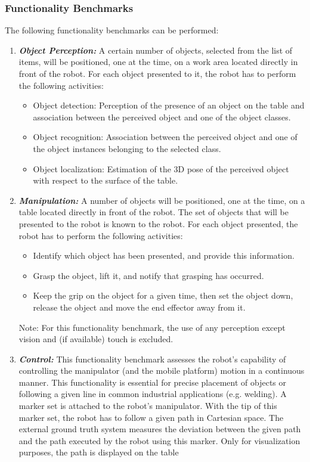 \subsubsection{Functionality Benchmarks}
\label{sssec:nutshellroawfunctionality}
The following functionality benchmarks can be performed:

\begin{enumerate}
	\item \textbf{\emph{Object Perception:}} A certain number of objects, selected from the list of \erlir items, will be positioned, one at the time, on a work area located directly in front of the robot. For each object presented to it, the robot has to perform the following activities:
	\begin{itemize}
		\item Object detection: Perception of the presence of an object on the table and association between the perceived object and one of the object classes.
		\item Object recognition: Association between the perceived object and one of the object instances belonging to the selected class.
		\item Object localization: Estimation of the 3D pose of the perceived object with respect to the surface of the table.
	\end{itemize}
	
	\item \textbf{\emph{Manipulation:}} A number of objects will be positioned, one at the time, on a table located directly in front of the robot. 
	The set of objects that will be presented to the robot is known to the robot. 
	For each object presented, the robot has to perform the following activities:
	\begin{itemize}
		\item Identify which object has been presented, and provide this information.
		\item Grasp the object, lift it, and notify that grasping has occurred.
		\item Keep the grip on the object for a given time, then set the object down, release the object and move the end effector away from it.
	\end{itemize}
	Note: For this functionality benchmark, the use of any perception except vision and (if available) touch is excluded.
	
	\item \textbf{\emph{Control:}} This functionality benchmark assesses the robot's capability of controlling the manipulator (and the mobile platform) motion in a continuous manner. 
	This functionality is essential for precise placement of objects or following a given line in common industrial applications (e.g. welding).
	A marker set is attached to the robot's manipulator. With the tip of this marker set, the robot has to follow a given path in Cartesian space. The external ground truth system measures the deviation between the given path and the path executed by the robot using this marker. Only for visualization purposes, the path is displayed on the table
	

\end{enumerate}
